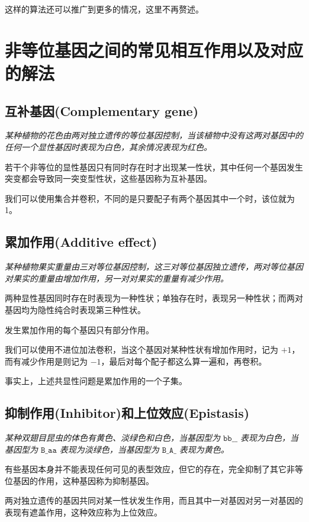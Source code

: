 \documentclass[12pt]{article} %
\begin{document}
这样的算法还可以推广到更多的情况，这里不再赘述。

\section{非等位基因之间的常见相互作用以及对应的解法}

\subsection{互补基因(Complementary gene)}

\textsl{某种植物的花色由两对独立遗传的等位基因控制，当该植物中没有这两对基因中的任何一个显性基因时表现为白色，其余情况表现为红色。}

若干个非等位的显性基因只有同时存在时才出现某一性状，其中任何一个基因发生突变都会导致同一突变型性状，这些基因称为互补基因。

我们可以使用集合并卷积，不同的是只要配子有两个基因其中一个时，该位就为 1。

\subsection{累加作用(Additive effect)}

\textsl{某种植物果实重量由三对等位基因控制，这三对等位基因独立遗传，两对等位基因对果实的重量由增加作用，另一对对果实的重量有减少作用。}

两种显性基因同时存在时表现为一种性状；单独存在时，表现另一种性状；而两对基因均为隐性纯合时表现第三种性状。

发生累加作用的每个基因只有部分作用。

我们可以使用不进位加法卷积，当这个基因对某种性状有增加作用时，记为 $+1$，而有减少作用是则记为 $-1$，最后对每个配子都这么算一遍和，再卷积。

事实上，上述共显性问题是累加作用的一个子集。

\subsection{抑制作用(Inhibitor)和上位效应(Epistasis)}

\textsl{某种双翅目昆虫的体色有黄色、淡绿色和白色，当基因型为 $\texttt{bb\_\_}$ 表现为白色，当基因型为 $\texttt{B\_aa}$ 表现为淡绿色，当基因型为 $\texttt{B\_A\_}$ 表现为黄色。}

有些基因本身并不能表现任何可见的表型效应，但它的存在，完全抑制了其它非等位基因的作用，这种基因称为抑制基因。

两对独立遗传的基因共同对某一性状发生作用，而且其中一对基因对另一对基因的表现有遮盖作用，这种效应称为上位效应。
\end{document}
